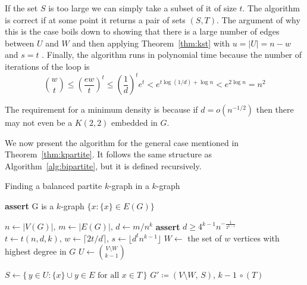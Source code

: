 If the set $S$ is too large we can simply take a subset of it of size $t$.
The algorithm is correct if at some point it returns a pair of sets $(S, T)$.
The argument of why this is the case boils down to showing that there is a
large number of edges between $U$ and $W$ and then applying Theorem~\ref{thm:kst}
with $u = |U| = n - w$ and $s = t$ .
Finally, the algorithm runs in polynomial time because 
the  number of iterations of the loop is
\[
    \binom{w}{t} \leq
    \left(\frac{ew}{t}\right)^t \leq
    \left(\frac{1}{d}\right)^t e^t < e^{t \log (1/d) + \log n} <
    e^{2\log n} = n^2
\]

\begin{remark}
    The requirement for a minimum density is because if $d = o\left(n^{-1/2}\right)$ then
    there may not even be a $K(2, 2)$ embedded in $G$. %
\end{remark}

We now present the algorithm for the general case mentioned in Theorem~\ref{thm:kpartite}.
It follows the same structure as Algorithm~\ref{alg:bipartite},
but it is defined recursively.

\begin{algorithm}
    \caption{Finding a balanced partite $k$-graph in a $k$-graph}
    \label{alg:kpartite}
    \begin{algorithmic}[1]
            \State \textbf{assert} G is a $k$-graph
                \State \Return $\{x : \{x\} \in E(G)\}$
            \EndIf

            \State $n \gets |V(G)|,\, m \gets |E(G)|,\, d \gets m/n^k$
            \State \textbf{assert} $d \geq 4^{k-1} n^{-\frac{1}{2^{k-1}}}$ \label{line:min_density}
            \State $t \gets t(n, d, k),\, w \gets \lceil 2t/d \rceil,\, s \gets \lfloor d^t n^{k-1} \rfloor$ \label{line:tws}
            \State $W \gets$ the set of $w$ vertices with highest degree in $G$ \label{line:W}
            \State $U \gets \binom{V\setminus W}{k-1}$

             \label{line:for}
                \State $S \gets \{\,y \in U : \{x\} \cup y \in E \text{ for all } x \in T\,\}$
                    \State \Return {}
                    {$G' \coloneqq (V \setminus W,\, S),\, k-1$} $\circ \, (T)$\label{line:return}
                \EndIf
            \EndFor
        \EndFunction
    \end{algorithmic}
\end{algorithm}

